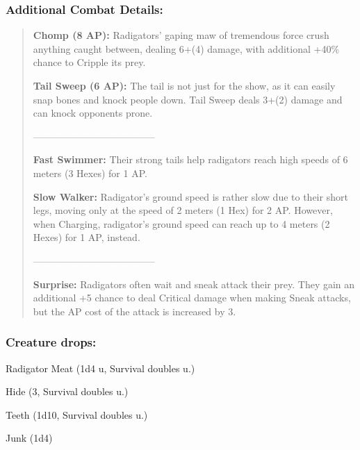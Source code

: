 \documentclass[11pt,a4paper,twocolumn]{book}
\begin{document}
	\subsubsection*{Additional Combat Details:}
	\begin{verse}
	
		\textbf{Chomp (8 AP):} Radigators' gaping maw of tremendous force crush anything caught between, dealing 6+(4) damage, with additional +40\% chance to Cripple its prey.
		
		
		\textbf{Tail Sweep (6 AP):} The tail is not just for the show, as it can easily snap bones and knock people down. Tail Sweep deals 3+(2) damage and can knock opponents prone.
		
--------------------------------------		
			
		\textbf{Fast Swimmer:} Their strong tails help radigators reach high speeds of 6 meters (3 Hexes) for 1 AP.
		
		\textbf{Slow Walker:} Radigator's ground speed is rather slow due to their short legs, moving only at the speed of 2 meters (1 Hex) for 2 AP. However, when Charging, radigator's ground speed can reach up to 4 meters (2 Hexes) for 1 AP, instead.
		
		--------------------------------------
		
		\textbf{Surprise:} Radigators often wait and sneak attack their prey. They gain an additional +5 chance to deal Critical damage when making Sneak attacks, but the AP cost of the attack is increased by 3.
		
%		
	\end{verse}
	
	\subsubsection*{Creature drops:}
	\begin{compactitem}
		\item Radigator Meat (1d4 u, Survival doubles u.)
		\item Hide (3, Survival doubles u.)
		\item Teeth (1d10, Survival doubles u.)
		\item Junk (1d4)
	\end{compactitem}
	
\end{document}
